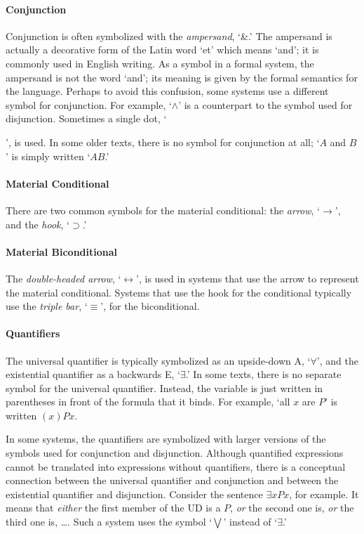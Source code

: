 \paragraph{Conjunction}
Conjunction is often symbolized with the \emph{ampersand}, `{\&}.' The ampersand is actually a decorative form of the Latin word `et' which means `and'; it is commonly used in English writing. As a symbol in a formal system, the ampersand is not the word `and'; its meaning is given by the formal semantics for the language. Perhaps to avoid this confusion, some systems use a different symbol for conjunction. For example, `$\wedge$' is a counterpart to the symbol used for disjunction. Sometimes a single dot, `\begin{scriptsize}\textbullet\end{scriptsize}', is used. In some older texts, there is no symbol for conjunction at all; `$A$ and $B$' is simply written `$AB$.'


\paragraph{Material Conditional} There are two common symbols for the material conditional: the \emph{arrow}, `$\rightarrow$', and the \emph{hook}, `$\supset$.'

\paragraph{Material Biconditional} The \emph{double-headed arrow}, `$\leftrightarrow$', is used in systems that use the arrow to represent the material conditional. Systems that use the hook for the conditional typically use the \emph{triple bar}, `$\equiv$', for the biconditional.

\paragraph{Quantifiers} The universal quantifier is typically symbolized as an upside-down A, `$\forall$', and the existential quantifier as a backwards E, `$\exists$.' In some texts, there is no separate symbol for the universal quantifier. Instead, the variable is just written in parentheses in front of the formula that it binds. For example, `all $x$ are $P$' is written $(x)Px$.

In some systems, the quantifiers are symbolized with larger versions of the symbols used for conjunction and disjunction. Although quantified expressions cannot be translated into expressions without quantifiers, there is a conceptual connection between the universal quantifier and conjunction and between the existential quantifier and disjunction. Consider the sentence $\exists x Px$, for example. It means that \emph{either} the first member of the UD is a $P$, \emph{or} the second one is, \emph{or} the third one is, {\ldots}. Such a system uses the symbol `$\bigvee$' instead of `$\exists$.'




